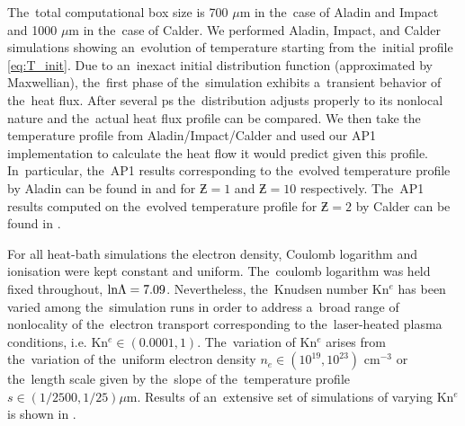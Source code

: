 The~total computational box size is 700 $\mu$m in the~case
of Aladin and Impact and 1000 $\mu$m in the~case of Calder.
We performed Aladin, Impact, and Calder simulations showing an~evolution of
temperature starting from the~initial profile \eqref{eq:T_init}. 
Due to an~inexact initial distribution function (approximated by Maxwellian),
the~first phase of the~simulation exhibits a~transient behavior of the~heat
flux. After several ps the~distribution adjusts properly to its nonlocal nature
and the~actual heat flux profile can be compared. 
We then take the temperature profile from Aladin/Impact/Calder and used 
our AP1 implementation to calculate the heat flow
it would predict given this profile. In~particular, the~AP1 results 
corresponding to the~evolved temperature profile by Aladin can be found
in  and  for 
$\Zbar = 1$ and $\Zbar = 10$ respectively. The~AP1 results computed on
the~evolved temperature profile for $\Zbar = 2$ 
by Calder can be found in .

For all heat-bath simulations the electron density, Coulomb logarithm and 
ionisation were kept constant and uniform.
The~coulomb logarithm was held fixed throughout, 
$\text{ln}\Lambda = 7.09$.
Nevertheless, the~Knudsen number Kn$^e$ has been varied among the~simulation 
runs in order to address a~broad range of nonlocality of 
the~electron transport corresponding 
to the~laser-heated plasma conditions, i.e. Kn$^e \in (0.0001, 1)$. 
The~variation of Kn$^e$ arises from the~variation
of the~uniform electron density $n_e \in (10^{19}, 10^{23})$ cm$^{-3}$ or 
the~length scale given by the~slope of the~temperature profile 
$s \in (1/2500, 1/25) \mu$m. Results of an~extensive set of simulations of
varying Kn$^e$ is shown in .
 

